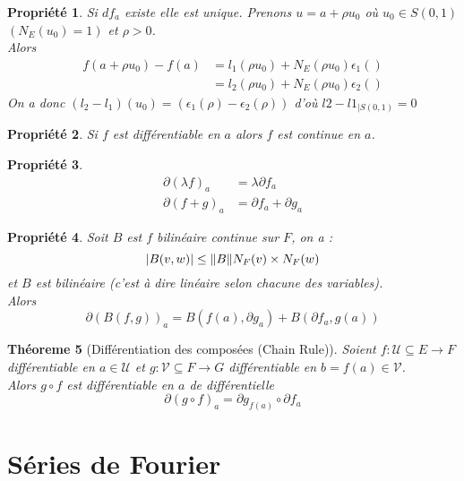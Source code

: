 \documentclass[a4paper, oneside]{report}
\theoremstyle{break}
\newtheorem{thm}{Théoreme}[section] %
\newtheorem{propr}[thm]{Propriété}
\newcommand{\x}{\times}
\newcommand{\U}{\mathcal{U}}
\DeclarePairedDelimiter\abs{\lvert}{\rvert}%
\DeclarePairedDelimiter\norm{\lVert}{\rVert}%
\begin{document}
\begin{propr}
Si $df_a$ existe elle est unique. Prenons $u=a+\rho u_0$ où $u_0\in S(0,1)$ $(N_E(u_0)=1)$ et $\rho > 0$.\\
Alors
\begin{align*}
f(a+\rho u_0)-f(a)&=l_1(\rho u_0)+N_E(\rho u_0)\epsilon_1()\\
&=l_2(\rho u_0)+N_E(\rho u_0)\epsilon_2()
\end{align*}
On a donc $(l_2-l_1)(u_0)=(\epsilon_1(\rho)-\epsilon_2(\rho))$ d'où $l2-l1_{| S(0,1)}=0$
\end{propr}

\begin{propr}
Si $f$ est différentiable en $a$ alors $f$ est continue en $a$.
\end{propr}

\begin{propr}
\begin{align*}
\partial(\lambda f)_a&=\lambda \partial f_a\\
\partial (f+g)_a &=\partial f_a + \partial g_a
\end{align*}
\end{propr}

\begin{propr}
Soit $B$ est $f$ bilinéaire continue sur $F$, on a :
$$\abs{B(v,w)}\leq \norm{B}N_F(v)\x N_F(w)$$
et $B$ est bilinéaire (c'est à dire linéaire selon chacune des variables).\\
Alors
$$\partial (B(f,g))_a = B(f(a),\partial g_a)+ B(\partial f_a, g(a))$$
\end{propr}

\begin{thm}[Différentiation des composées (Chain Rule)]
Soient $f:\U \subseteq E \rightarrow F$ différentiable en $a\in \U$ et $g:\mathcal{V} \subseteq F \rightarrow G$ différentiable en $b=f(a)\in \mathcal{V}$.\\
Alors $g\circ f$ est différentiable en $a$ de différentielle
$$\partial(g\circ f)_a = \partial g_{f(a)}\circ \partial f_a$$
\end{thm}






















\chapter{Séries de Fourier}
\end{document}
